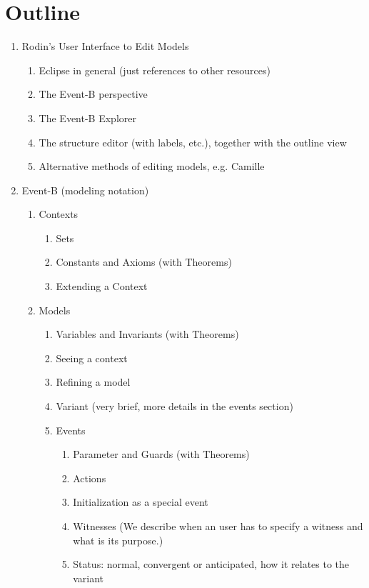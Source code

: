 
\section{Outline}

\begin{enumerate}
\item Rodin's User Interface to Edit Models
  \begin{enumerate}
  \item Eclipse in general (just references to other resources)
  \item The Event-B perspective
  \item The Event-B Explorer
  \item The structure editor (with labels, etc.), together with the outline view
  \item Alternative methods of editing models, e.g. Camille
  \end{enumerate}
\item Event-B (modeling notation)
  \begin{enumerate}
  \item Contexts
    \begin{enumerate}
    \item Sets
    \item Constants and Axioms (with Theorems)
    \item Extending a Context
    \end{enumerate}
  \item Models
    \begin{enumerate}
    \item Variables and Invariants (with Theorems)
    \item Seeing a context
    \item Refining a model
    \item Variant (very brief, more details in the events section)
    \item Events
      \begin{enumerate}
      \item Parameter and Guards (with Theorems)
      \item Actions
      \item Initialization as a special event
      \item Witnesses (We describe when an user has to specify a witness and
        what is its purpose.)
      \item Status: normal, convergent or anticipated, how it relates to the variant
      \end{enumerate}

\end{enumerate}
\end{enumerate}
\end{enumerate}
